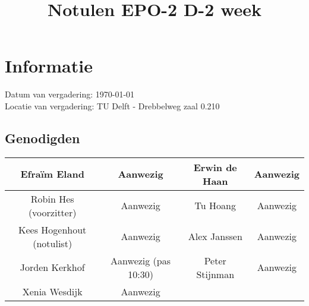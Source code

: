 \documentclass{article}
\begin{document}
\title{Notulen EPO-2 D-2 week }%
\author{}%
\maketitle

\section*{Informatie}
Datum van vergadering: \today \\ %
Locatie van vergadering: TU Delft - Drebbelweg zaal 0.210 %
\subsection*{Genodigden}
\begin{center}
\begin{tabular}{|c |c | c| c|}
	\hline
Efraïm Eland & Aanwezig & Erwin de Haan & Aanwezig \\
	\hline
Robin Hes (voorzitter) & Aanwezig & Tu Hoang & Aanwezig \\
	\hline
Kees Hogenhout (notulist) & Aanwezig & Alex Janssen & Aanwezig\\
	\hline
Jorden Kerkhof & Aanwezig (pas 10:30) & Peter Stijnman & Aanwezig \\
	\hline
Xenia Wesdijk & Aanwezig & & \\
	\hline
\end{tabular}
\end{center}
\end{document}
